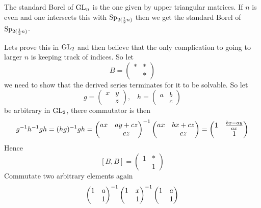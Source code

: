     \begin{example}
        The standard Borel of \(\operatorname{GL}_n\) is the one given by upper triangular matrices. If \(n\) is even and one intersects this with \(\operatorname{Sp}_{2(\frac{1}{2}n)}\) then we get the standard Borel of \(\operatorname{Sp}_{2(\frac{1}{2}n)}\).

        Lets prove this in \(\operatorname{GL}_2\) and then believe that the only complication to going to larger \(n\) is keeping track of indices. So let 
        \[B = \begin{pmatrix}
            \ast & \ast \\
             & \ast
        \end{pmatrix}\]
        we need to show that the derived series terminates for it to be solvable. So let 
        \[g = \begin{pmatrix}
            x & y\\
             & z
        \end{pmatrix}, \;\;\; h = \begin{pmatrix}
            a & b \\
            & c
        \end{pmatrix}\]
        be arbitrary in \(\operatorname{GL}_2\), there commutator is then 
        \[g^{-1} h^{-1} gh = (hg)^{-1} gh = \begin{pmatrix}
        ax & ay + cz \\ & cz
        \end{pmatrix}^{-1} \begin{pmatrix}
            ax & bx + cz\\ & cz
        \end{pmatrix} = \begin{pmatrix}
            1 & \frac{bx - ay}{ax} \\ & 1
        \end{pmatrix} \]
        Hence
        \[[B, B] = \begin{pmatrix}
            1 & \ast \\ & 1
        \end{pmatrix}\]
        Commutate two arbitrary elements again 
        \[\begin{pmatrix}
            1 & a \\ & 1
        \end{pmatrix}^{-1}\begin{pmatrix}
            1 & x \\ & 1
        \end{pmatrix}^{-1} \begin{pmatrix}
            1 & a \\ & 1

\end{pmatrix}\]
\end{example}
